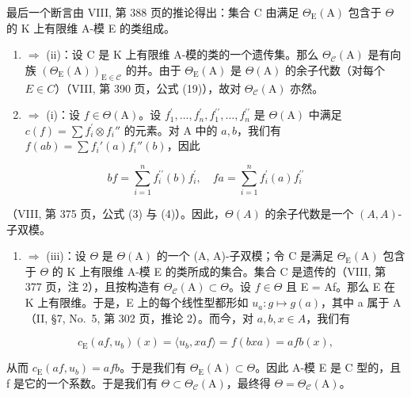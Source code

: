 最后一个断言由 VIII, 第 388 页的推论得出：集合 C 由满足 \(\Theta_{\mathrm{E}}(\mathrm{A})\) 包含于 \(\Theta\) 的 K 上有限维 A-模 E 的类组成。

\begin{enumerate}
\def\labelenumi{(\roman{enumi})}
\setcounter{enumi}{2}
\item
  \(\Rightarrow\) (ii)：设 C 是 K 上有限维 A-模的类的一个遗传集。那么 \(\Theta_{\mathcal{C}}(\mathrm{A})\) 是有向族 \((\Theta_{\mathrm{E}}(\mathrm{A}))_{\mathrm{E}\in\mathcal{C}}\) 的并。由于 \(\Theta_{\mathrm{E}}(\mathrm{A})\) 是 \(\Theta(\mathrm{A})\) 的余子代数（对每个 \(E\in C\)）（VIII, 第 390 页，公式 (19)），故对 \(\Theta_{\mathcal{C}}(\mathrm{A})\) 亦然。
\item
  \(\Rightarrow\) (i)：设 \(f\in \Theta (\mathrm{A})\)。设 \(f_{1}^{\prime},\ldots ,f_{n}^{\prime},f_{1}^{\prime \prime},\ldots ,f_{n}^{\prime \prime}\) 是 \(\Theta (\mathrm{A})\) 中满足 \(c(f) = \sum f_i^\prime \otimes f_i''\) 的元素。对 A 中的 \(a,b\)，我们有 \(f(ab) = \sum f_i'(a)f_i''(b)\)，因此
\end{enumerate}

\[
b f = \sum_ {i = 1} ^ {n} f _ {i} ^ {\prime \prime} (b) f _ {i} ^ {\prime}, \quad f a = \sum_ {i = 1} ^ {n} f _ {i} ^ {\prime} (a) f _ {i} ^ {\prime \prime}
\]

（VIII, 第 375 页，公式 (3) 与 (4)）。因此，\(\Theta(A)\) 的余子代数是一个 \((A, A)\)-子双模。

\begin{enumerate}
\def\labelenumi{(\roman{enumi})}
\tightlist
\item
  \(\Rightarrow\) (iii)：设 \(\Theta\) 是 \(\Theta(\mathrm{A})\) 的一个 (A, A)-子双模；令 C 是满足 \(\Theta_{\mathrm{E}}(\mathrm{A})\) 包含于 \(\Theta\) 的 K 上有限维 A-模 E 的类所成的集合。集合 C 是遗传的（VIII, 第 377 页，注 2），且按构造有 \(\Theta_{\mathcal{C}}(\mathrm{A}) \subset \Theta\)。设 \(f \in \Theta\) 且 E = Af。那么 E 在 K 上有限维。于是，E 上的每个线性型都形如 \(u_{a}: g \mapsto g(a)\)，其中 a 属于 A（II, §7, No.~5, 第 302 页，推论 2）。而今，对 \(a, b, x \in A\)，我们有
\end{enumerate}

\[
c _ {\mathrm{E}} (a f, u _ {b}) (x) = \langle u _ {b}, x a f \rangle = f (b x a) = a f b (x),
\]

从而 \(c_{\mathrm{E}}(af, u_{b}) = afb\)。于是我们有 \(\Theta_{\mathrm{E}}(\mathrm{A}) \subset \Theta\)。因此 A-模 E 是 C 型的，且 f 是它的一个系数。于是我们有 \(\Theta \subset \Theta_{\mathcal{C}}(\mathrm{A})\)，最终得 \(\Theta = \Theta_{\mathcal{C}}(\mathrm{A})\)。

